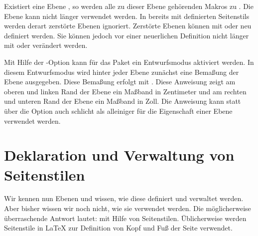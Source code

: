 \begin{Declaration}
\end{Declaration}
Existiert eine Ebene , so werden alle zu dieser Ebene
gehörenden Makros zu . Die Ebene kann nicht länger verwendet
werden. In bereits mit  definierten Seitenstils werden
derart zerstörte Ebenen ignoriert. Zerstörte Ebenen können mit
 oder
 neu definiert werden. Sie können jedoch
vor einer neuerlichen Definition nicht länger mit
 oder
 verändert werden.%
\iffalse %
\par
Die Anweisung ist dazu bestimmt, innerhalb des Arguments \PName{Code} von
\DescRef{\LabelBase.cmd.scrlayerOnAutoRemoveInterface} (siehe
\autoref{sec:scrlayer.enduserinterfaces},
\DescPageRef{scrlayer.cmd.scrlayerOnAutoRemoveInterface}) verwendet zu
werden. Damit können Ebenen, die unter Verwendung von entfernbaren Anweisungen
einer entfernbaren Benutzerschnittstelle definiert wurden, zusammen mit dieser
Benutzerschnittstelle entfernt werden.%
\fi%
\EndIndexGroup


\begin{Declaration}
\end{Declaration}
Mit Hilfe der \KOMAScript-Option
kann für das Paket  ein Entwurfsmodus aktiviert werden. In
diesem Entwurfsmodus wird hinter jeder Ebene zunächst eine Bemaßung der Ebene
ausgegeben. Diese Bemaßung erfolgt mit . Diese
Anweisung zeigt am oberen und linken Rand der Ebene ein Maßband in Zentimeter
und am rechten und unteren Rand der Ebene ein Maßband in Zoll. Die Anweisung
 kann statt über die Option auch schlicht als
alleiniger  für die Eigenschaft  einer Ebene
verwendet werden.%
%
\EndIndexGroup


\section{Deklaration und Verwaltung von Seitenstilen}

\BeginIndexGroup
{}%
Wir kennen nun Ebenen und wissen, wie diese definiert und verwaltet
werden. Aber bisher wissen wir noch nicht, wie sie verwendet werden. Die
möglicherweise überraschende Antwort lautet: mit Hilfe von
Seitenstilen. Üblicherweise werden Seitenstile in \LaTeX{} zur Definition von
Kopf und Fuß der Seite verwendet.

